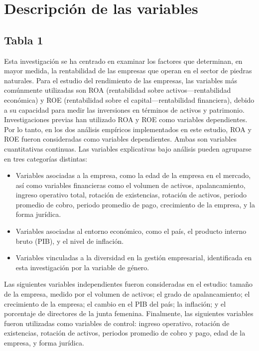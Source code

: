 \documentclass[
]{article}
\begin{document}
\section{Descripción de las
variables}\label{descripciuxf3n-de-las-variables}

\subsection{Tabla 1}\label{tabla-1}

Esta investigación se ha centrado en examinar los factores que
determinan, en mayor medida, la rentabilidad de las empresas que operan
en el sector de piedras naturales. Para el estudio del rendimiento de
las empresas, las variables más comúnmente utilizadas son ROA
(rentabilidad sobre activos---rentabilidad económica) y ROE
(rentabilidad sobre el capital---rentabilidad financiera), debido a su
capacidad para medir las inversiones en términos de activos y
patrimonio. Investigaciones previas han utilizado ROA y ROE como
variables dependientes. Por lo tanto, en los dos análisis empíricos
implementados en este estudio, ROA y ROE fueron consideradas como
variables dependientes. Ambas son variables cuantitativas continuas. Las
variables explicativas bajo análisis pueden agruparse en tres categorías
distintas:

\begin{itemize}
\item
  Variables asociadas a la empresa, como la edad de la empresa en el
  mercado, así como variables financieras como el volumen de activos,
  apalancamiento, ingreso operativo total, rotación de existencias,
  rotación de activos, periodo promedio de cobro, periodo promedio de
  pago, crecimiento de la empresa, y la forma jurídica.
\item
  Variables asociadas al entorno económico, como el país, el producto
  interno bruto (PIB), y el nivel de inflación.
\item
  Variables vinculadas a la diversidad en la gestión empresarial,
  identificada en esta investigación por la variable de género.
\end{itemize}

Las siguientes variables independientes fueron consideradas en el
estudio: tamaño de la empresa, medido por el volumen de activos; el
grado de apalancamiento; el crecimiento de la empresa; el cambio en el
PIB del país; la inflación; y el porcentaje de directores de la junta
femenina. Finalmente, las siguientes variables fueron utilizadas como
variables de control: ingreso operativo, rotación de existencias,
rotación de activos, periodos promedio de cobro y pago, edad de la
empresa, y forma jurídica.
\end{document}
